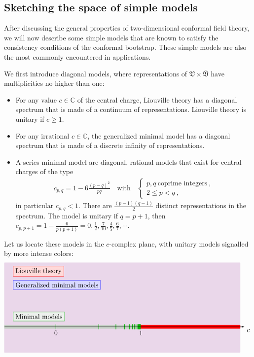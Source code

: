\documentclass[12pt, a4paper, notitlepage, twoside]{report}
\numberwithin{equation}{section}
\theoremstyle{break}
\begin{document}
\subsection{Sketching the space of simple models \label{secmomo}}

After discussing the general properties of two-dimensional conformal field theory, we will now describe some simple models that are known to satisfy the consistency conditions of the conformal bootstrap.
These simple models are also the most commonly encountered in applications.  

We first introduce diagonal models, where representations of $\mathfrak{V}\times \overline{\mathfrak{V}}$ have multiplicities no higher than one:
\begin{itemize}
 \item For any value $c\in\mathbb{C}$ of the central charge, Liouville theory
has a diagonal spectrum that is made of a continuum of representations.
Liouville theory is unitary if $c\geq 1$. 
\item For any irrational $c\in\mathbb{C}$, the generalized minimal model has a diagonal spectrum that is made of a discrete infinity of representations.
\item A-series minimal model are diagonal, rational models that exist for central charges of the type
\begin{align}
 c_{p,q} = 1 - 6 \frac{(p-q)^2}{pq}  \quad \text{with} \quad \left\{\begin{array}{l}  p,q \ \text{coprime  integers}\ , \\ 2\leq p<q\ , \end{array}\right.  
\label{cpq}
\end{align}
in particular $c_{p,q} <1$.
There are $\frac{(p-1)(q-1)}{2}$ distinct representations in the spectrum.
The model is unitary if $q=p+1$, then $c_{p,p+1}=1-\frac{6}{p(p+1)}=0,\frac12,\frac{7}{10},\frac45, \frac67,\cdots$.
\end{itemize}
Let us locate these models in the $c$-complex plane, with unitary models signalled by more intense colors:
\begin{align}
 \begin{tikzpicture}[scale = 4.5, baseline=(current  bounding  box.center)]
 \filldraw [blue!50!red, opacity = .15] (2.15, -.3) -- (2.15, .75) -- (-.6, .75) -- (-.6, -.3) -- cycle;
 \node [draw = red, fill = red!15, right] at (-.5, .65) {Liouville theory};
 \node [draw = blue, fill = blue!15, right] at (-.5, .49) {Generalized minimal models};
 \node[draw = green!70!black, fill = green!16!black!7, right] at (-.5, .12) {Minimal models};
  \filldraw [red] (.98, -.02) -- (.98, .02) -- (2.15, .02) -- (2.15, -.02) -- cycle;
  \filldraw [green!70!black, opacity = .15] (-.6, -.02) -- (-.6, .02) -- (.98, .02) -- (.98, -.02) -- cycle;
 \foreach \p in {2,...,20}
  {
  \draw [green!70!black, thick] ({1-6/(\p*(\p+1))}, -.03) -- ({1-6/(\p*(\p+1))}, .03);
  }
  \node [below] at (0, -.02) {$0$};  \node [below] at (.99, -.02) {$1$};
  \draw[-latex] (-.6, 0) -- (2.2, 0) node [below right] {$c$};
\end{tikzpicture}
\end{align}
\end{document}
